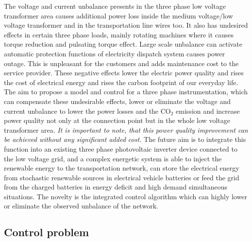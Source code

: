     The voltage and current unbalance presents in the three phase low voltage transformer area causes additional power loss inside the medium voltage/low voltage transformer and in the transportation line wires too. It also has undesired effects in certain three phase loads, mainly rotating machines where it causes torque reduction and pulsating torque effect. Large scale unbalance can activate automatic protection functions of electricity dispatch system causes power outage. This is unpleasant for the customers and adds maintenance cost to the service provider. These negative effects lower the electric power quality and rises the cost of electrical energy and rises the carbon footprint of our everyday life. The aim to propose a model and control for a three phase instrumentation, which can compensate these undesirable effects, lower or eliminate the voltage and current unbalance to lower the power losses and the CO${}_2$ emission and increase power quality not only at the connection point but in the whole low voltage transformer area. \emph{It is important to note, that this power quality improvement can be achieved without any significant added cost.} The future aim is to integrate this function into an existing three phase photovoltaic inverter device connected to the low voltage grid, and a  complex energetic system is able to inject the renewable energy to the transportation network, can store the electrical energy from stochastic renewable sources in electrical vehicle batteries or feed the grid from the charged batteries in energy deficit and high demand simultaneous situations. The novelty is the integrated control algorithm which can highly lower or eliminate the observed unbalance of the network.

    \subsection{Control problem}\label{VUB:sec:Control}

